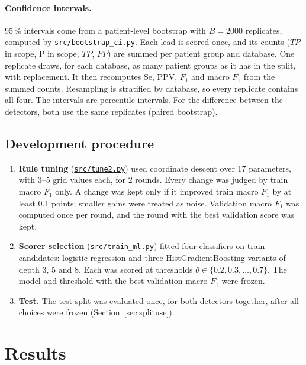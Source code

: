 \documentclass[11pt,a4paper]{article}
\newcommand{\code}[1]{\texttt{#1}}
\newcommand{\repourl}{https://github.com/BierschneiderEmanuel/pWaveDetection}
\newcommand{\repofile}[2]{\href{\repourl/blob/main/#2}{\code{#1}}}
\begin{document}
\paragraph{Confidence intervals.} 95\,\% intervals come from a patient-level bootstrap with $B = 2000$ replicates, computed by \repofile{src/bootstrap\_ci.py}{src/bootstrap_ci.py}. Each lead is scored once, and its counts ($TP$ in scope, P in scope, $TP$, $FP$) are summed per patient group and database. One replicate draws, for each database, as many patient groups as it has in the split, with replacement. It then recomputes Se, PPV, $F_1$ and macro $F_1$ from the summed counts. Resampling is stratified by database, so every replicate contains all four. The intervals are percentile intervals. For the difference between the detectors, both use the same replicates (paired bootstrap).

\subsection{Development procedure}

\begin{enumerate}
\item \textbf{Rule tuning} (\repofile{src/tune2.py}{src/tune2.py}) used coordinate descent over 17 parameters, with 3--5 grid values each, for 2 rounds. Every change was judged by train macro $F_1$ only. A change was kept only if it improved train macro $F_1$ by at least 0.1 points; smaller gains were treated as noise. Validation macro $F_1$ was computed once per round, and the round with the best validation score was kept.
\item \textbf{Scorer selection} (\repofile{src/train\_ml.py}{src/train_ml.py}) fitted four classifiers on train candidates: logistic regression and three HistGradientBoosting variants of depth 3, 5 and 8. Each was scored at thresholds $\theta \in \{0.2, 0.3, \dots, 0.7\}$. The model and threshold with the best validation macro $F_1$ were frozen.
\item \textbf{Test.} The test split was evaluated once, for both detectors together, after all choices were frozen (Section~\ref{sec:splituse}).
\end{enumerate}

\section{Results}
\label{sec:results}
\end{document}
